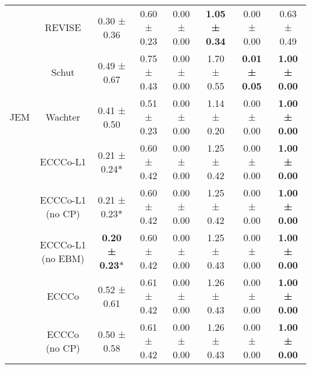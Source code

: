 \begin{table}
{\begin{tabular}[t]{cccccccc}
 & REVISE & 0.30 ± 0.36\hphantom{*}\hphantom{*} & 0.60 ± 0.23\hphantom{*}\hphantom{*} & 0.00 ± 0.00\hphantom{*}\hphantom{*} & \textbf{1.05 ± 0.34}\hphantom{*}\hphantom{*} & 0.00 ± 0.00\hphantom{*}\hphantom{*} & 0.63 ± 0.49\hphantom{*}\hphantom{*}\\

 & Schut & 0.49 ± 0.67\hphantom{*}\hphantom{*} & 0.75 ± 0.43\hphantom{*}\hphantom{*} & 0.00 ± 0.00\hphantom{*}\hphantom{*} & 1.70 ± 0.55\hphantom{*}\hphantom{*} & \textbf{0.01 ± 0.05}\hphantom{*}\hphantom{*} & \textbf{1.00 ± 0.00}\hphantom{*}\hphantom{*}\\

\multirow[t]{-9}{*}{\centering\arraybackslash JEM} & Wachter & 0.41 ± 0.50\hphantom{*}\hphantom{*} & 0.51 ± 0.23\hphantom{*}\hphantom{*} & 0.00 ± 0.00\hphantom{*}\hphantom{*} & 1.14 ± 0.20\hphantom{*}\hphantom{*} & 0.00 ± 0.00\hphantom{*}\hphantom{*} & \textbf{1.00 ± 0.00}\hphantom{*}\hphantom{*}\\
\cmidrule{1-8}
 & ECCCo-L1 & 0.21 ± 0.24*\hphantom{*} & 0.60 ± 0.42\hphantom{*}\hphantom{*} & 0.00 ± 0.00\hphantom{*}\hphantom{*} & 1.25 ± 0.42\hphantom{*}\hphantom{*} & 0.00 ± 0.00\hphantom{*}\hphantom{*} & \textbf{1.00 ± 0.00}\hphantom{*}\hphantom{*}\\

 & ECCCo-L1 (no CP) & 0.21 ± 0.23*\hphantom{*} & 0.60 ± 0.42\hphantom{*}\hphantom{*} & 0.00 ± 0.00\hphantom{*}\hphantom{*} & 1.25 ± 0.42\hphantom{*}\hphantom{*} & 0.00 ± 0.00\hphantom{*}\hphantom{*} & \textbf{1.00 ± 0.00}\hphantom{*}\hphantom{*}\\

 & ECCCo-L1 (no EBM) & \textbf{0.20 ± 0.23}*\hphantom{*} & 0.60 ± 0.42\hphantom{*}\hphantom{*} & 0.00 ± 0.00\hphantom{*}\hphantom{*} & 1.25 ± 0.43\hphantom{*}\hphantom{*} & 0.00 ± 0.00\hphantom{*}\hphantom{*} & \textbf{1.00 ± 0.00}\hphantom{*}\hphantom{*}\\

 & ECCCo & 0.52 ± 0.61\hphantom{*}\hphantom{*} & 0.61 ± 0.42\hphantom{*}\hphantom{*} & 0.00 ± 0.00\hphantom{*}\hphantom{*} & 1.26 ± 0.43\hphantom{*}\hphantom{*} & 0.00 ± 0.00\hphantom{*}\hphantom{*} & \textbf{1.00 ± 0.00}\hphantom{*}\hphantom{*}\\

 & ECCCo (no CP) & 0.50 ± 0.58\hphantom{*}\hphantom{*} & 0.61 ± 0.42\hphantom{*}\hphantom{*} & 0.00 ± 0.00\hphantom{*}\hphantom{*} & 1.26 ± 0.43\hphantom{*}\hphantom{*} & 0.00 ± 0.00\hphantom{*}\hphantom{*} & \textbf{1.00 ± 0.00}\hphantom{*}\hphantom{*}\\


\end{tabular}}
\end{table}
